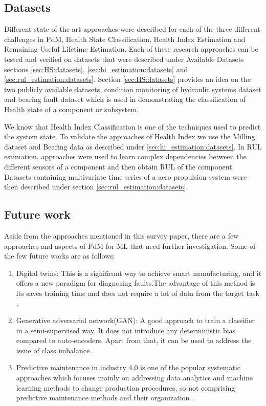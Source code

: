 \subsection*{Datasets}

Different state-of-the art approaches were described for each of the three different challenges in PdM, Health State Classification, Health Index Estimation and Remaining Useful Lifetime Estimation. Each of these research approaches can be tested and verified on datasets that were described under Available Datasets sections \ref{sec:HS:datasets}, \ref{sec:hi_estimation:datasets} and \ref{sec:rul_estimation:datasets}. Section \ref{sec:HS:datasets} provides an idea on the two publicly available datasets, condition monitoring of hydraulic systems dataset and bearing fault dataset which is used in demonstrating the classification of Health state of a component or subsystem.

We know that Health Index Classification is one of the techniques used to predict the system state. To validate the approaches of Health Index we use the Milling dataset and Bearing data as described under \ref{sec:hi_estimation:datasets}. In RUL estimation, approaches were used to learn complex dependencies between the different sensors of a component and then obtain RUL of the component. Datasets containing multivariate time series of a aero propulsion system were then described under section \ref{sec:rul_estimation:datasets}.

\subsection*{Future work}

Aside from the approaches mentioned in this survey paper, there are a few approaches and aspects of PdM for ML that need further investigation. Some of the few future works are as follows:


\begin{enumerate}
    \item Digital twins: This is a significant way to achieve smart manufacturing, and it offers a new paradigm for diagnosing faults.The advantage of this method is its saves training time and does not require a lot of data from the target task \cite{DBLP:journals/access/XuSLZ19}.

    \item Generative adversarial network(GAN): A good approach to train a classifier in a semi-supervised way. It does not introduce any deterministic bias compared to auto-encoders. Apart from that, it can be used to address the issue of class imbalance \cite{Goodfellow2014GenerativeAN}.

    \item Predictive maintenance in industry 4.0 is one of the popular systematic approaches which focuses mainly on addressing data analytics and machine learning methods to change production procedures, so not comprising predictive maintenance methods and their organization \cite{DBLP:journals/candie/ZontaCRLTL20}.
\end{enumerate}

